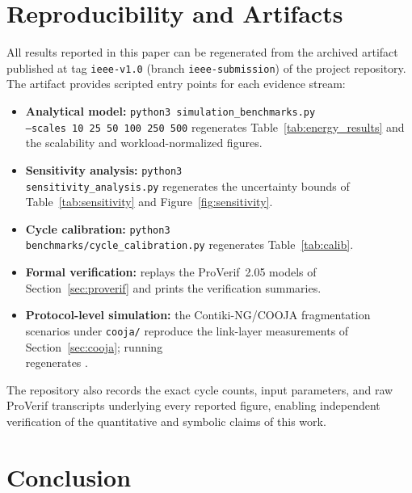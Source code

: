 \documentclass[journal]{IEEEtran}
\begin{document}
\section{Reproducibility and Artifacts}
\label{sec:reproducibility}

All results reported in this paper can be regenerated from the archived artifact
published at tag \texttt{ieee-v1.0} (branch \texttt{ieee-submission}) of the
project repository. The artifact
provides scripted entry points for each evidence stream:
\begin{itemize}
  \item \textbf{Analytical model:} \texttt{python3 simulation\_benchmarks.py}\\
        \texttt{--scales 10 25 50 100 250 500} regenerates
        Table~\ref{tab:energy_results} and the scalability and
        workload-normalized figures.
  \item \textbf{Sensitivity analysis:} \texttt{python3}\\
        \texttt{sensitivity\_analysis.py} regenerates the uncertainty bounds of
        Table~\ref{tab:sensitivity} and Figure~\ref{fig:sensitivity}.
  \item \textbf{Cycle calibration:} \texttt{python3}\\
        \texttt{benchmarks/cycle\_calibration.py} regenerates Table~\ref{tab:calib}.
  \item \textbf{Formal verification:}  replays the
        ProVerif~2.05 models of
        Section~\ref{sec:proverif} and prints the verification summaries.
  \item \textbf{Protocol-level simulation:} the Contiki-NG/COOJA fragmentation
        scenarios under \texttt{cooja/} reproduce the link-layer measurements of
        Section~\ref{sec:cooja}; running\\
         regenerates
        .
\end{itemize}

The repository also records the exact cycle counts, input parameters, and raw
ProVerif transcripts underlying every reported figure, enabling independent
verification of the quantitative and symbolic claims of this work.


\section{Conclusion}
\end{document}
